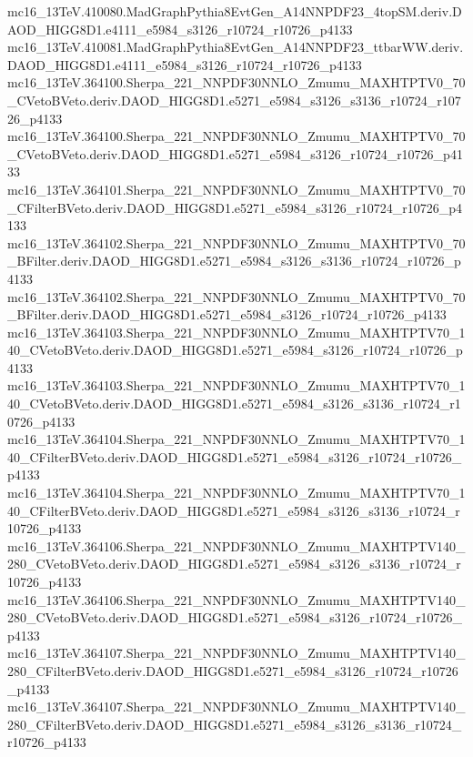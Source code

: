 \begin{footnotesize}
mc16\_13TeV.410080.MadGraphPythia8EvtGen\_A14NNPDF23\_4topSM.deriv.DAOD\_HIGG8D1.e4111\_e5984\_s3126\_r10724\_r10726\_p4133 \\
mc16\_13TeV.410081.MadGraphPythia8EvtGen\_A14NNPDF23\_ttbarWW.deriv.DAOD\_HIGG8D1.e4111\_e5984\_s3126\_r10724\_r10726\_p4133 \\
mc16\_13TeV.364100.Sherpa\_221\_NNPDF30NNLO\_Zmumu\_MAXHTPTV0\_70\_CVetoBVeto.deriv.DAOD\_HIGG8D1.e5271\_e5984\_s3126\_s3136\_r10724\_r10726\_p4133 \\
mc16\_13TeV.364100.Sherpa\_221\_NNPDF30NNLO\_Zmumu\_MAXHTPTV0\_70\_CVetoBVeto.deriv.DAOD\_HIGG8D1.e5271\_e5984\_s3126\_r10724\_r10726\_p4133 \\
mc16\_13TeV.364101.Sherpa\_221\_NNPDF30NNLO\_Zmumu\_MAXHTPTV0\_70\_CFilterBVeto.deriv.DAOD\_HIGG8D1.e5271\_e5984\_s3126\_r10724\_r10726\_p4133 \\
mc16\_13TeV.364102.Sherpa\_221\_NNPDF30NNLO\_Zmumu\_MAXHTPTV0\_70\_BFilter.deriv.DAOD\_HIGG8D1.e5271\_e5984\_s3126\_s3136\_r10724\_r10726\_p4133 \\
mc16\_13TeV.364102.Sherpa\_221\_NNPDF30NNLO\_Zmumu\_MAXHTPTV0\_70\_BFilter.deriv.DAOD\_HIGG8D1.e5271\_e5984\_s3126\_r10724\_r10726\_p4133 \\
mc16\_13TeV.364103.Sherpa\_221\_NNPDF30NNLO\_Zmumu\_MAXHTPTV70\_140\_CVetoBVeto.deriv.DAOD\_HIGG8D1.e5271\_e5984\_s3126\_r10724\_r10726\_p4133 \\
mc16\_13TeV.364103.Sherpa\_221\_NNPDF30NNLO\_Zmumu\_MAXHTPTV70\_140\_CVetoBVeto.deriv.DAOD\_HIGG8D1.e5271\_e5984\_s3126\_s3136\_r10724\_r10726\_p4133 \\
mc16\_13TeV.364104.Sherpa\_221\_NNPDF30NNLO\_Zmumu\_MAXHTPTV70\_140\_CFilterBVeto.deriv.DAOD\_HIGG8D1.e5271\_e5984\_s3126\_r10724\_r10726\_p4133 \\
mc16\_13TeV.364104.Sherpa\_221\_NNPDF30NNLO\_Zmumu\_MAXHTPTV70\_140\_CFilterBVeto.deriv.DAOD\_HIGG8D1.e5271\_e5984\_s3126\_s3136\_r10724\_r10726\_p4133 \\
mc16\_13TeV.364106.Sherpa\_221\_NNPDF30NNLO\_Zmumu\_MAXHTPTV140\_280\_CVetoBVeto.deriv.DAOD\_HIGG8D1.e5271\_e5984\_s3126\_s3136\_r10724\_r10726\_p4133 \\
mc16\_13TeV.364106.Sherpa\_221\_NNPDF30NNLO\_Zmumu\_MAXHTPTV140\_280\_CVetoBVeto.deriv.DAOD\_HIGG8D1.e5271\_e5984\_s3126\_r10724\_r10726\_p4133 \\
mc16\_13TeV.364107.Sherpa\_221\_NNPDF30NNLO\_Zmumu\_MAXHTPTV140\_280\_CFilterBVeto.deriv.DAOD\_HIGG8D1.e5271\_e5984\_s3126\_r10724\_r10726\_p4133 \\
mc16\_13TeV.364107.Sherpa\_221\_NNPDF30NNLO\_Zmumu\_MAXHTPTV140\_280\_CFilterBVeto.deriv.DAOD\_HIGG8D1.e5271\_e5984\_s3126\_s3136\_r10724\_r10726\_p4133 \\

\end{footnotesize}
